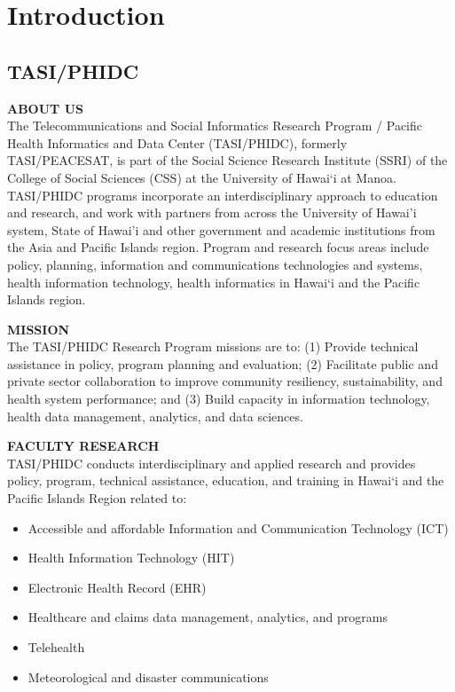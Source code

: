 \section{Introduction} \label{section: introduction}
\textcolor{red}{\lipsum[1]}
\subsection{TASI/PHIDC}

\textbf{ABOUT US}
\\
The Telecommunications and Social Informatics Research Program / Pacific Health Informatics and Data Center (TASI/PHIDC), formerly TASI/PEACESAT, is part of the Social Science Research Institute (SSRI) of the College of Social Sciences (CSS) at the University of Hawai‘i at Manoa. TASI/PHIDC programs incorporate an interdisciplinary approach to education and research, and work with partners from across the University of Hawai’i system, State of Hawai’i and other government and academic institutions from the Asia and Pacific Islands region. Program and research focus areas include policy, planning, information and communications technologies and systems, health information technology, health informatics in Hawai‘i and the Pacific Islands region.

\textbf{MISSION}
\\
The TASI/PHIDC Research Program missions are to: (1) Provide technical assistance in policy, program planning and evaluation; (2) Facilitate public and private sector collaboration to improve community resiliency, sustainability, and health system performance; and (3) Build capacity in information technology, health data management, analytics, and data sciences.

\textbf{FACULTY RESEARCH}
\\
TASI/PHIDC conducts interdisciplinary and applied research and provides policy, program, technical assistance, education, and training in Hawai‘i and the Pacific Islands Region related to:

\begin{itemize}
    \item Accessible and affordable Information and Communication Technology (ICT)
    \item Health Information Technology (HIT)
    \item Electronic Health Record (EHR)
    \item Healthcare and claims data management, analytics, and programs
    \item Telehealth
    \item Meteorological and disaster communications
\end{itemize}

